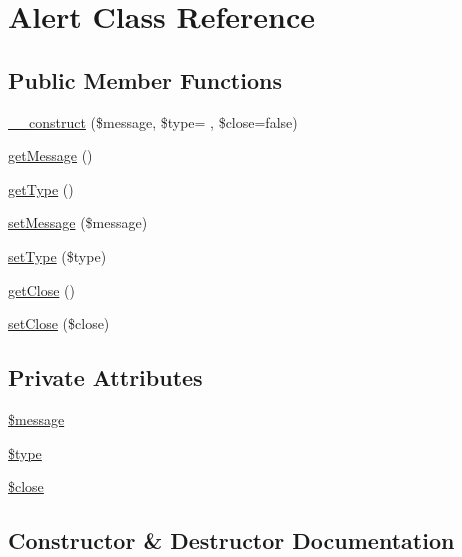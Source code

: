 \hypertarget{class_alert}{}\section{Alert Class Reference}
\label{class_alert}
\subsection*{Public Member Functions}
\begin{DoxyCompactItemize}
\item 
\hyperlink{class_alert_a2564261f354133df503904b341912dbd}{\+\_\+\+\_\+construct} (\$message, \$type= \textquotesingle{}\textquotesingle{}, \$close=false)
\item 
\hyperlink{class_alert_a0b0e611236742aac18ba1936d03ba89a}{get\+Message} ()
\item 
\hyperlink{class_alert_a830b5c75df72b32396701bc563fbe3c7}{get\+Type} ()
\item 
\hyperlink{class_alert_a6991eb53548e7180a3a8e6f418fbb234}{set\+Message} (\$message)
\item 
\hyperlink{class_alert_ade096bf521b5d05dcaff2ba1a42e9f71}{set\+Type} (\$type)
\item 
\hyperlink{class_alert_acfa7fbd7ea5270e643717e1d1be7088a}{get\+Close} ()
\item 
\hyperlink{class_alert_a0c8f32a26ed7d21ac0a7d3a1fa9ed7f4}{set\+Close} (\$close)
\end{DoxyCompactItemize}
\subsection*{Private Attributes}
\begin{DoxyCompactItemize}
\item 
\hyperlink{class_alert_abf17cb2dba2ed17cb28aa5f37deb5293}{\$message}
\item 
\hyperlink{class_alert_a9a4a6fba2208984cabb3afacadf33919}{\$type}
\item 
\hyperlink{class_alert_a51cd9fedf8d1ad7e753b0bad0dd554de}{\$close}
\end{DoxyCompactItemize}


\subsection{Constructor \& Destructor Documentation}
\hypertarget{class_alert_a2564261f354133df503904b341912dbd}{}

